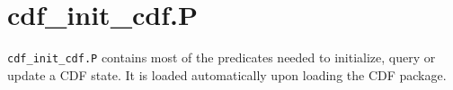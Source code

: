 
\chapter{cdf\_init\_cdf.P}

{\tt cdf\_init\_cdf.P} contains most of the predicates needed to
initialize, query or update a CDF state.  It is loaded automatically
upon loading the CDF package.












